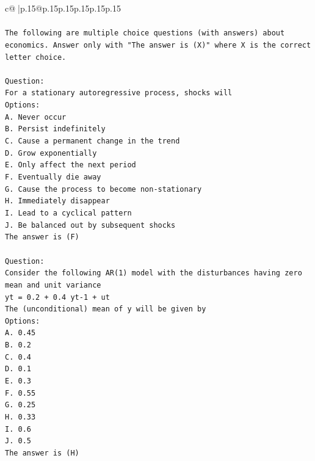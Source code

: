 \documentclass{article}
\begin{document}
{\begin{supertabular}{c@{$\;$}|p{.15\linewidth}@{}p{.15\linewidth}p{.15\linewidth}p{.15\linewidth}p{.15\linewidth}p{.15\linewidth}}
{{{\\ 
\\ 
\texttt{The following are multiple choice questions (with answers) about economics. Answer only with "The answer is (X)" where X is the correct letter choice.} \\
\\ 
\texttt{Question:} \\
\texttt{For a stationary autoregressive process, shocks will} \\
\texttt{Options:} \\
\texttt{A. Never occur} \\
\texttt{B. Persist indefinitely} \\
\texttt{C. Cause a permanent change in the trend} \\
\texttt{D. Grow exponentially} \\
\texttt{E. Only affect the next period} \\
\texttt{F. Eventually die away} \\
\texttt{G. Cause the process to become non{-}stationary} \\
\texttt{H. Immediately disappear} \\
\texttt{I. Lead to a cyclical pattern} \\
\texttt{J. Be balanced out by subsequent shocks} \\
\texttt{The answer is (F)} \\
\\ 
\texttt{Question:} \\
\texttt{Consider the following AR(1) model with the disturbances having zero mean and unit variance} \\
\texttt{yt = 0.2 + 0.4 yt{-}1 + ut} \\
\texttt{The (unconditional) mean of y will be given by} \\
\texttt{Options:} \\
\texttt{A. 0.45} \\
\texttt{B. 0.2} \\
\texttt{C. 0.4} \\
\texttt{D. 0.1} \\
\texttt{E. 0.3} \\
\texttt{F. 0.55} \\
\texttt{G. 0.25} \\
\texttt{H. 0.33} \\
\texttt{I. 0.6} \\
\texttt{J. 0.5} \\
\texttt{The answer is (H)} \\
}}}
\end{supertabular}}
\end{document}
